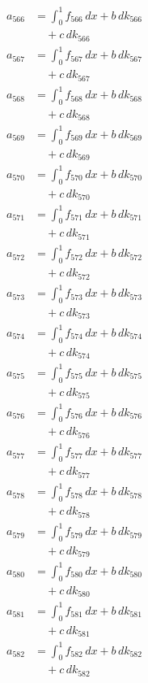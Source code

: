 \documentclass{article}
\begin{document}
\begin{align}
a_{566} &= \int_0^1 f_{566}\,dx + b\,dk_{566} \\
&\quad + c\,dk_{566} \\
a_{567} &= \int_0^1 f_{567}\,dx + b\,dk_{567} \\
&\quad + c\,dk_{567} \\
a_{568} &= \int_0^1 f_{568}\,dx + b\,dk_{568} \\
&\quad + c\,dk_{568} \\
a_{569} &= \int_0^1 f_{569}\,dx + b\,dk_{569} \\
&\quad + c\,dk_{569} \\
a_{570} &= \int_0^1 f_{570}\,dx + b\,dk_{570} \\
&\quad + c\,dk_{570} \\
a_{571} &= \int_0^1 f_{571}\,dx + b\,dk_{571} \\
&\quad + c\,dk_{571} \\
a_{572} &= \int_0^1 f_{572}\,dx + b\,dk_{572} \\
&\quad + c\,dk_{572} \\
a_{573} &= \int_0^1 f_{573}\,dx + b\,dk_{573} \\
&\quad + c\,dk_{573} \\
a_{574} &= \int_0^1 f_{574}\,dx + b\,dk_{574} \\
&\quad + c\,dk_{574} \\
a_{575} &= \int_0^1 f_{575}\,dx + b\,dk_{575} \\
&\quad + c\,dk_{575} \\
a_{576} &= \int_0^1 f_{576}\,dx + b\,dk_{576} \\
&\quad + c\,dk_{576} \\
a_{577} &= \int_0^1 f_{577}\,dx + b\,dk_{577} \\
&\quad + c\,dk_{577} \\
a_{578} &= \int_0^1 f_{578}\,dx + b\,dk_{578} \\
&\quad + c\,dk_{578} \\
a_{579} &= \int_0^1 f_{579}\,dx + b\,dk_{579} \\
&\quad + c\,dk_{579} \\
a_{580} &= \int_0^1 f_{580}\,dx + b\,dk_{580} \\
&\quad + c\,dk_{580} \\
a_{581} &= \int_0^1 f_{581}\,dx + b\,dk_{581} \\
&\quad + c\,dk_{581} \\
a_{582} &= \int_0^1 f_{582}\,dx + b\,dk_{582} \\
&\quad + c\,dk_{582} \\

\end{align}
\end{document}
